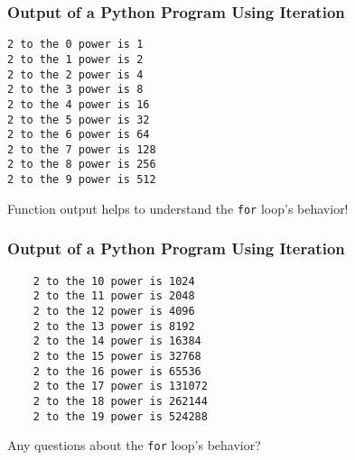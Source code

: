 \documentclass[14pt,aspectratio=169]{beamer}
\begin{document}
%
\begin{frame}[fragile]
  \frametitle{Output of a Python Program Using Iteration}
  \normalsize
  \begin{minipage}{6in}
    \vspace*{.25in}
    \begin{verbatim}
2 to the 0 power is 1
2 to the 1 power is 2
2 to the 2 power is 4
2 to the 3 power is 8
2 to the 4 power is 16
2 to the 5 power is 32
2 to the 6 power is 64
2 to the 7 power is 128
2 to the 8 power is 256
2 to the 9 power is 512
    \end{verbatim}
  \end{minipage}
  \vspace*{.05in}
  \begin{center}
    \normalsize \noindent Function output helps to understand the {\tt for} loop's behavior!\\
  \end{center}
\end{frame}

%
\begin{frame}[fragile]
  \frametitle{Output of a Python Program Using Iteration}
  \normalsize
  \hspace*{-.35in}
  \begin{minipage}{6in}
    \vspace*{.25in}
    \begin{verbatim}
    2 to the 10 power is 1024
    2 to the 11 power is 2048
    2 to the 12 power is 4096
    2 to the 13 power is 8192
    2 to the 14 power is 16384
    2 to the 15 power is 32768
    2 to the 16 power is 65536
    2 to the 17 power is 131072
    2 to the 18 power is 262144
    2 to the 19 power is 524288
    \end{verbatim}
  \end{minipage}
  \vspace*{.05in}
  \begin{center}
    \normalsize \noindent Any questions about the  {\tt for} loop's behavior?\\
  \end{center}
\end{frame}
\end{document}
